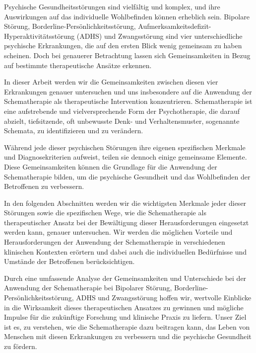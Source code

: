 Psychische Gesundheitsstörungen sind vielfältig und komplex, und ihre Auswirkungen auf das individuelle Wohlbefinden können erheblich sein. Bipolare Störung, Borderline-Persönlichkeitsstörung, Aufmerksamkeitsdefizit-Hyperaktivitätsstörung (ADHS) und Zwangsstörung sind vier unterschiedliche psychische Erkrankungen, die auf den ersten Blick wenig gemeinsam zu haben scheinen. Doch bei genauerer Betrachtung lassen sich Gemeinsamkeiten in Bezug auf bestimmte therapeutische Ansätze erkennen.

In dieser Arbeit werden wir die Gemeinsamkeiten zwischen diesen vier Erkrankungen genauer untersuchen und uns insbesondere auf die Anwendung der Schematherapie als therapeutische Intervention konzentrieren. Schematherapie ist eine aufstrebende und vielversprechende Form der Psychotherapie, die darauf abzielt, tiefsitzende, oft unbewusste Denk- und Verhaltensmuster, sogenannte Schemata, zu identifizieren und zu verändern.

Während jede dieser psychischen Störungen ihre eigenen spezifischen Merkmale und Diagnosekriterien aufweist, teilen sie dennoch einige gemeinsame Elemente. Diese Gemeinsamkeiten können die Grundlage für die Anwendung der Schematherapie bilden, um die psychische Gesundheit und das Wohlbefinden der Betroffenen zu verbessern.

In den folgenden Abschnitten werden wir die wichtigsten Merkmale jeder dieser Störungen sowie die spezifischen Wege, wie die Schematherapie als therapeutischer Ansatz bei der Bewältigung dieser Herausforderungen eingesetzt werden kann, genauer untersuchen. Wir werden die möglichen Vorteile und Herausforderungen der Anwendung der Schematherapie in verschiedenen klinischen Kontexten erörtern und dabei auch die individuellen Bedürfnisse und Umstände der Betroffenen berücksichtigen.

Durch eine umfassende Analyse der Gemeinsamkeiten und Unterschiede bei der Anwendung der Schematherapie bei Bipolarer Störung, Borderline-Persönlichkeitsstörung, ADHS und Zwangsstörung hoffen wir, wertvolle Einblicke in die Wirksamkeit dieses therapeutischen Ansatzes zu gewinnen und mögliche Impulse für die zukünftige Forschung und klinische Praxis zu liefern. Unser Ziel ist es, zu verstehen, wie die Schematherapie dazu beitragen kann, das Leben von Menschen mit diesen Erkrankungen zu verbessern und die psychische Gesundheit zu fördern.